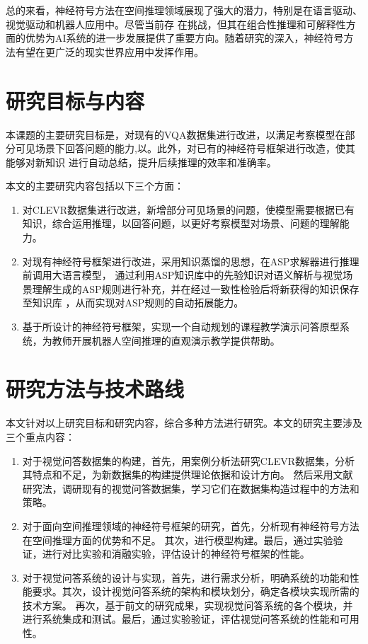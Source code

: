 总的来看，神经符号方法在空间推理领域展现了强大的潜力，特别是在语言驱动、视觉驱动和机器人应用中。尽管当前存
在挑战，但其在组合性推理和可解释性方面的优势为AI系统的进一步发展提供了重要方向。随着研究的深入，神经符号方法有望在更广泛的现实世界应用中发挥作用。

\section{研究目标与内容}
本课题的主要研究目标是，对现有的VQA数据集进行改进，以满足考察模型在部分可见场景下回答问题的能力,以。此外，对已有的神经符号框架进行改造，使其能够对新知识
进行自动总结，提升后续推理的效率和准确率。

本文的主要研究内容包括以下三个方面：

\begin{enumerate}[label=(\arabic*),itemsep=0pt,parsep=0pt]
    \item 对CLEVR数据集进行改进，新增部分可见场景的问题，使模型需要根据已有知识，综合运用推理，以回答问题，以更好考察模型对场景、问题的理解能力。
    \item 对现有神经符号框架进行改进，采用知识蒸馏的思想，在ASP求解器进行推理前调用大语言模型，
通过利用ASP知识库中的先验知识对语义解析与视觉场景理解生成的ASP规则进行补充，并在经过一致性检验后将新获得的知识保存至知识库
，从而实现对ASP规则的自动拓展能力。
    \item 基于所设计的神经符号框架，实现一个自动规划的课程教学演示问答原型系统，为教师开展机器人空间推理的直观演示教学提供帮助。
\end{enumerate}

\section{研究方法与技术路线}
本文针对以上研究目标和研究内容，综合多种方法进行研究。本文的研究主要涉及三个重点内容：
\begin{enumerate}[label=(\arabic*),itemsep=0pt,parsep=0pt]
    \item 对于视觉问答数据集的构建，首先，用案例分析法研究CLEVR数据集，分析其特点和不足，为新数据集的构建提供理论依据和设计方向。
然后采用文献研究法，调研现有的视觉问答数据集，学习它们在数据集构造过程中的方法和策略。
    \item 对于面向空间推理领域的神经符号框架的研究，首先，分析现有神经符号方法在空间推理方面的优势和不足。
其次，进行模型构建。最后，通过实验验证，进行对比实验和消融实验，评估设计的神经符号框架的性能。
    \item 对于视觉问答系统的设计与实现，首先，进行需求分析，明确系统的功能和性能要求。其次，设计视觉问答系统的架构和模块划分，确定各模块实现所需的技术方案。
再次，基于前文的研究成果，实现视觉问答系统的各个模块，并进行系统集成和测试。最后，通过实验验证，评估视觉问答系统的性能和可用性。
\end{enumerate}

